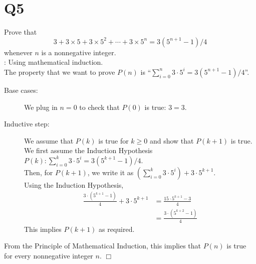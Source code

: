 \documentclass[11pt]{article}
\def\endproofmark{$\Box$}
\newenvironment{proof}{{\bf Proof}:}{\endproofmark\smallskip}
\begin{document}
\section*{Q5}
Prove that
\begin{equation*}
  3+3 \times 5+3\times 5^{2}+ \cdots +3\times 5^{n}=3(5^{n+1}-1)/4
\end{equation*}
whenever $n$ is a nonnegative integer.
\\
\begin{proof}
    Using mathematical induction. 
    \\
    The property that we want
    to prove $P(n)$ is
    ``$\sum_{i=0}^n{3\cdot 5^{i}}=3(5^{n+1}-1)/4$''.
    \begin{description}
        
        \item [Base cases:] We plug in $n=0$ to check that $P(0)$
        is true: $3=3$.
        
        \item [Inductive step:] We assume that $P(k)$ is true 
        for $k \ge 0$ and show that $P(k+1)$ is true.\\
        We first assume the Induction Hypothesis 
        $P(k):\sum_{i=0}^k{3\cdot 5^{i}}=3(5^{k+1}-1)/4$.\\
        Then, for $P(k+1)$, 
        we write it as $(\sum_{i=0}^k{3\cdot 5^{i}})+3\cdot 5^{k+1}$.
        \\
        Using the Induction Hypothesis,
        \begin{align*}
            \frac{3\cdot (5^{k+1}-1)}{4}+3\cdot 5^{k+1}
            &=\frac{15\cdot 5^{k+1}-3}{4}\\
            &=\frac{3\cdot (5^{k+2}-1)}{4}
        \end{align*}
        This implies $P(k+1)$ as required.
    \end{description}
    From the Principle of Mathematical Induction, 
    this implies that $P(n)$ is true for every nonnegative integer $n$. 
\end{proof}
\end{document}
